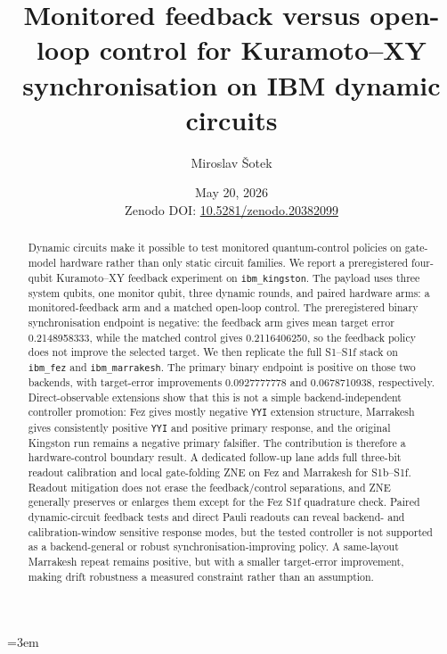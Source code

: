 \documentclass[preprint,aps,physrev,superscriptaddress,floatfix,longbibliography]{revtex4-2}
\newcommand{\paperdoi}{Zenodo DOI: \href{https://doi.org/10.5281/zenodo.20382099}{10.5281/zenodo.20382099}}
\begin{document}
\emergencystretch=3em

\title{Monitored feedback versus open-loop control for Kuramoto--XY synchronisation on IBM dynamic circuits}

\author{Miroslav \v{S}otek}

\date{May 20, 2026\\\paperdoi}

\begin{abstract}
Dynamic circuits make it possible to test monitored quantum-control policies
on gate-model hardware rather than only static circuit families. We report a
preregistered four-qubit Kuramoto--XY feedback experiment on
\texttt{ibm\_kingston}. The payload uses three system qubits, one monitor
qubit, three dynamic rounds, and paired hardware arms: a monitored-feedback
arm and a matched open-loop control. The preregistered binary synchronisation
endpoint is negative: the feedback arm gives mean target error 0.2148958333,
while the matched control gives 0.2116406250, so the feedback policy does not
improve the selected target. We then replicate the full S1--S1f stack on
\texttt{ibm\_fez} and \texttt{ibm\_marrakesh}. The primary binary endpoint is
positive on those two backends, with target-error improvements 0.0927777778
and 0.0678710938, respectively. Direct-observable extensions show that this
is not a simple backend-independent controller promotion: Fez gives mostly
negative \texttt{YYI} extension structure, Marrakesh gives consistently
positive \texttt{YYI} and positive primary response, and the original
Kingston run remains a negative primary falsifier. The contribution is
therefore a hardware-control boundary result. A dedicated follow-up lane adds
full three-bit readout calibration and local gate-folding ZNE on Fez and
Marrakesh for S1b--S1f. Readout mitigation does not erase the
feedback/control separations, and ZNE generally preserves or enlarges them
except for the Fez S1f quadrature check. Paired dynamic-circuit feedback
tests and direct Pauli readouts can reveal backend- and calibration-window
sensitive response modes, but the tested controller is not supported as a
backend-general or robust synchronisation-improving policy. A same-layout
Marrakesh repeat remains positive, but with a smaller target-error
improvement, making drift robustness a measured constraint rather than an
assumption.
\end{abstract}

\maketitle
\end{document}
